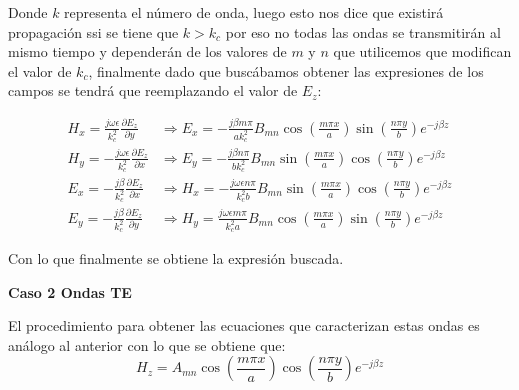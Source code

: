 \documentclass[
  11pt,
  letterpaper,
   addpoints,
   answers
  ]{exam}
\begin{document}
\begin{questions}
\begin{solution}
Donde $k$ representa el número de onda, luego esto nos dice que existirá propagación ssi se tiene que $k > k_c$ por eso no todas las ondas se transmitirán al mismo tiempo y dependerán de los valores de $m$ y $n$ que utilicemos que modifican el valor de $k_c$, finalmente dado que buscábamos obtener las expresiones de los campos se tendrá que reemplazando el valor de $E_z$:

\begin{align}
    H_x = \frac{j\omega\epsilon}{k_c^2} \frac{\partial E_z}{\partial y}
    &\Rightarrow
    E_x = -\frac{j\beta m\pi}{a k_c^2} B_{mn} \cos\left(\frac{m\pi x}{a}\right)\sin\left(\frac{n\pi y}{b}\right) e^{-j\beta z} \tag{62} \\
    H_y = -\frac{j\omega\epsilon}{k_c^2} \frac{\partial E_z}{\partial x}
    &\Rightarrow
    E_y = -\frac{j\beta n\pi}{b k_c^2} B_{mn} \sin\left(\frac{m\pi x}{a}\right)\cos\left(\frac{n\pi y}{b}\right) e^{-j\beta z} \tag{63} \\
    E_x = -\frac{j\beta}{k_c^2} \frac{\partial E_z}{\partial x}
    &\Rightarrow
    H_x = -\frac{j\omega\epsilon n\pi}{k_c^2 b} B_{mn} \sin\left(\frac{m\pi x}{a}\right)\cos\left(\frac{n\pi y}{b}\right) e^{-j\beta z} \tag{64} \\
    E_y = -\frac{j\beta}{k_c^2} \frac{\partial E_z}{\partial y}
    &\Rightarrow
    H_y = \frac{j\omega\epsilon m\pi}{k_c^2 a} B_{mn} \cos\left(\frac{m\pi x}{a}\right)\sin\left(\frac{n\pi y}{b}\right) e^{-j\beta z} \tag{65}
\end{align}

Con lo que finalmente se obtiene la expresión buscada.

\textbf{Caso 2 Ondas TE}

El procedimiento para obtener las ecuaciones que caracterizan estas ondas es análogo al anterior con lo que se obtiene que:
\begin{equation}
    H_z = A_{mn} \cos\left(\frac{m\pi x}{a}\right)\cos\left(\frac{n\pi y}{b}\right)e^{-j\beta z} \tag{66}
\end{equation}


\end{solution}
\end{questions}
\end{document}

